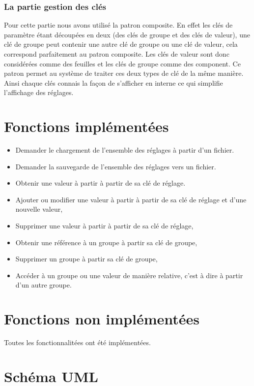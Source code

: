 \documentclass[12pt]{article}
\begin{document}
	\subsubsection{La partie gestion des clés}
	
		Pour cette partie nous avons utilisé la patron composite. En effet les clés de paramètre étant découpées en deux (des clés de groupe et des clés de valeur), une clé de groupe peut contenir une autre clé de groupe ou une clé de valeur, cela correspond parfaitement au patron composite. Les clés de valeur sont donc considérées comme des feuilles et les clés de groupe comme des component. Ce patron permet au système de traiter ces deux types de clé de la même manière. Ainsi chaque clés connais la façon de s'afficher en interne ce qui simplifie l'affichage des réglages.
\section{Fonctions implémentées}
\label{sec:fonctions_impl}

\begin{itemize}
	\item Demander le chargement de l’ensemble des réglages à partir d’un fichier.
	\item Demander la sauvegarde de l’ensemble des réglages vers un fichier.
	\item Obtenir une valeur à partir à partir de sa clé de réglage.
	\item Ajouter ou modifier une valeur à partir à partir de sa clé de réglage et d’une nouvelle valeur,
	\item Supprimer une valeur à partir à partir de sa clé de réglage,
	\item Obtenir une référence à un groupe à partir sa clé de groupe,
	\item Supprimer un groupe à partir sa clé de groupe,
	\item Accéder à un groupe ou une valeur de manière relative, c’est à dire à partir d’un autre groupe.
\end{itemize}

\section{Fonctions non implémentées}
\label{sec:fonctions_non_impl}
Toutes les fonctionnalitées ont été implémentées.

\section{Schéma UML}

\end{document}
